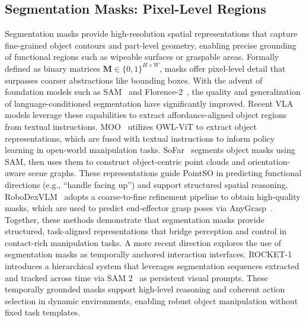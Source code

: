 \documentclass[10pt, a4paper, logo, copyright]{googledeepmind} %
\begin{document}
\subsection{Segmentation Masks: Pixel-Level Regions}
Segmentation masks provide high-resolution spatial representations that capture fine-grained object contours and part-level geometry, enabling precise grounding of functional regions such as wipeable surfaces or graspable areas. Formally defined as binary matrices $\mathbf{M} \in \{0,1\}^{H \times W}$, masks offer pixel-level detail that surpasses coarser abstractions like bounding boxes. With the advent of foundation models such as SAM~\cite{kirillov2023segment} and Florence-2~\cite{xiao2024florence}, the quality and generalization of language-conditioned segmentation have significantly improved. Recent VLA models leverage these capabilities to extract affordance-aligned object regions from textual instructions. 
MOO~\cite{stone2023open} utilizes OWL-ViT to extract object representations, which are fused with textual instructions to inform policy learning in open-world manipulation tasks. SoFar~\cite{qi2025sofar} segments object masks using SAM, then uses them to construct object-centric point clouds and orientation-aware scene graphs. These representations guide PointSO in predicting functional directions (e.g., “handle facing up”) and support structured spatial reasoning. RoboDexVLM~\cite{liu2025robodexvlm} adopts a coarse-to-fine refinement pipeline to obtain high-quality masks, which are used to predict end-effector grasp poses via AnyGrasp~\cite{fang2023anygrasp}. Together, these methods demonstrate that segmentation masks provide structured, task-aligned representations that bridge perception and control in contact-rich manipulation tasks. A more recent direction explores the use of segmentation masks as temporally anchored interaction interfaces. ROCKET-1~\cite{cai2025rocket} introduces a hierarchical system that leverages segmentation sequences extracted and tracked across time via SAM 2~\cite{ravi2024sam} as persistent visual prompts. These temporally grounded masks support high-level reasoning and coherent action selection in dynamic environments, enabling robust object manipulation without fixed task templates.
\end{document}
